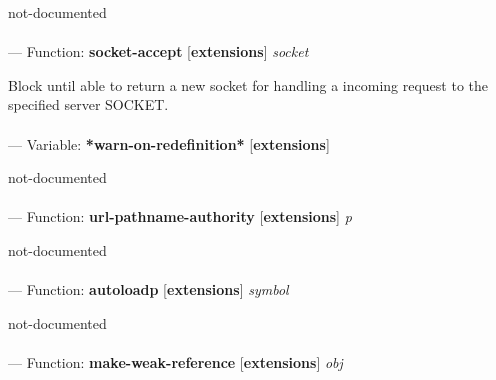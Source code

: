 \begin{adjustwidth}{5em}{5em}
not-documented
\end{adjustwidth}

\paragraph{}
\label{EXTENSIONS:SOCKET-ACCEPT}
--- Function: \textbf{socket-accept} [\textbf{extensions}] \textit{socket}

\begin{adjustwidth}{5em}{5em}
Block until able to return a new socket for handling a incoming request to the specified server SOCKET.
\end{adjustwidth}

\paragraph{}
\label{EXTENSIONS:*WARN-ON-REDEFINITION*}
--- Variable: \textbf{*warn-on-redefinition*} [\textbf{extensions}] \textit{}

\begin{adjustwidth}{5em}{5em}
not-documented
\end{adjustwidth}

\paragraph{}
\label{EXTENSIONS:URL-PATHNAME-AUTHORITY}
--- Function: \textbf{url-pathname-authority} [\textbf{extensions}] \textit{p}

\begin{adjustwidth}{5em}{5em}
not-documented
\end{adjustwidth}

\paragraph{}
\label{EXTENSIONS:AUTOLOADP}
--- Function: \textbf{autoloadp} [\textbf{extensions}] \textit{symbol}

\begin{adjustwidth}{5em}{5em}
not-documented
\end{adjustwidth}

\paragraph{}
\label{EXTENSIONS:MAKE-WEAK-REFERENCE}
--- Function: \textbf{make-weak-reference} [\textbf{extensions}] \textit{obj}

